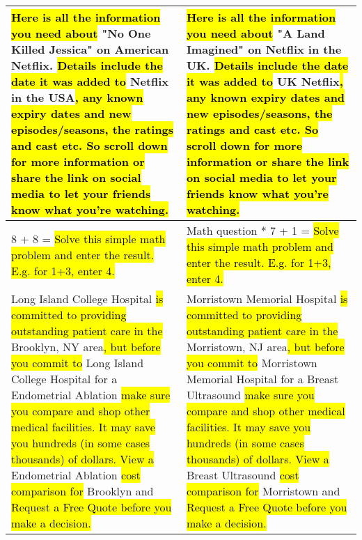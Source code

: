 \begin{table*}[htbp]
\begin{tabular}{p{.48\linewidth}|p{.48\linewidth}}
    \midrule
    \hl{Here is all the information you need about} "No One Killed Jessica" on American Netflix. \hl{Details include the date it was added to} Netflix in the USA\hl{, any known expiry dates and new episodes/seasons, the ratings and cast etc. So scroll down for more information or share the link on social media to let your friends know what you're watching.} &
    \hl{Here is all the information you need about} "A Land Imagined" on Netflix in the UK. \hl{Details include the date it was added to} UK Netflix\hl{, any known expiry dates and new episodes/seasons, the ratings and cast etc. So scroll down for more information or share the link on social media to let your friends know what you're watching.} \\
    \midrule
    8 + 8 = \hl{Solve this simple math problem and enter the result. E.g. for 1+3, enter 4.}
    & Math question * 7 + 1 = \hl{Solve this simple math problem and enter the result. E.g. for 1+3, enter 4.} \\
    \midrule
    Long Island College Hospital \hl{is committed to providing outstanding patient care in the} Brooklyn, NY area\hl{, but before you commit to} Long Island College Hospital for a Endometrial Ablation \hl{make sure you compare and shop other medical facilities. It may save you hundreds (in some cases thousands) of dollars. View a} Endometrial Ablation \hl{cost comparison for} Brooklyn and \hl{Request a Free Quote before you make a decision.} &
    Morristown Memorial Hospital \hl{is committed to providing outstanding patient care in the} Morristown, NJ area\hl{, but before you commit to} Morristown Memorial Hospital for a Breast Ultrasound \hl{make sure you compare and shop other medical facilities. It may save you hundreds (in some cases thousands) of dollars. View a} Breast Ultrasound \hl{cost comparison for} Morristown and \hl{Request a Free Quote before you make a decision.} \\
    \bottomrule
    \end{tabular}%
\end{table*}%
